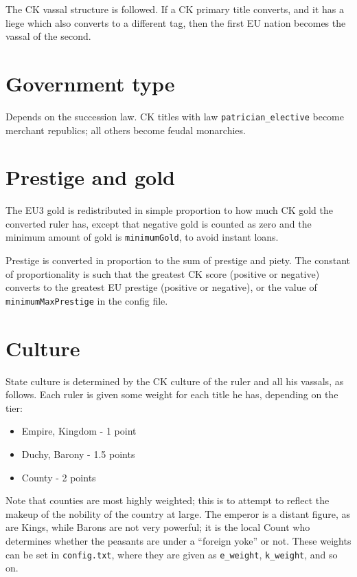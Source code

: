 \documentclass[12pt,ebook,oneside]{book}
\begin{document}
The CK vassal structure is followed. If a CK primary title converts,
and it has a liege which also converts to a different tag, then the first EU nation
becomes the vassal of the second. 

\section{Government type}

Depends on the succession law. CK titles with law
\verb|patrician_elective| become merchant republics; all others
become feudal monarchies.

\section{Prestige and gold}

The EU3 gold is redistributed in simple proportion to
how much CK gold the converted ruler has, except that 
negative gold is counted as zero and the minimum amount
of gold is \verb|minimumGold|, to avoid instant loans. 

Prestige is converted in proportion to the sum of prestige and
piety. The constant of proportionality is such that the greatest
CK score (positive or negative) converts to the greatest EU prestige
(positive or negative), or the value of \verb|minimumMaxPrestige| in
the config file. 

\section{Culture}

State culture is determined by the CK culture of the ruler and all his
vassals, as follows. Each ruler is given some weight for each title he
has, depending on the tier:
\begin{itemize}
\item Empire, Kingdom - 1 point
\item Duchy, Barony - 1.5 points
\item County - 2 points
\end{itemize}
Note that counties are most highly weighted; this is to attempt to
reflect the makeup of the nobility of the country at large. The
emperor is a distant figure, as are Kings, while Barons are not very
powerful; it is the local Count who
determines whether the peasants are under a ``foreign yoke'' or not.
These weights can be set in \verb|config.txt|, where they are given 
as \verb|e_weight|, \verb|k_weight|, and so on. 
\end{document}
